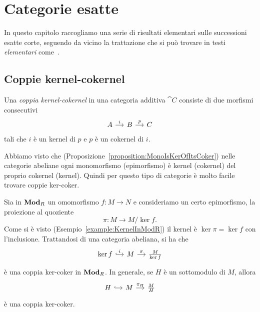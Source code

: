 
\chapter{Categorie esatte}

In questo capitolo raccogliamo una serie di risultati elementari sulle
successioni esatte corte, seguendo da vicino la trattazione che si può
trovare in testi {\em elementari} come~\cite{buehler:exactcategories}.



\section{Coppie kernel-cokernel}

\begin{definition}\label{definition:KerCoker}
  Una {\em coppia kernel-cokernel} in una categoria additiva \(\cat C\)
  consiste di due morfismi consecutivi
  \[
    \begin{tikzcd}[column sep=small]
      A \ar["i", r] & B \ar["p", r] & C
    \end{tikzcd}
  \]
  tali che \(i\) è un kernel di \(p\) e \(p\) è un cokernel di \(i\).
\end{definition}

Abbiamo visto che (Proposizione~\ref{proposition:MonoIsKerOfItsCoker})
nelle categorie abeliane ogni monomorfismo (epimorfismo) è kernel
(cokernel) del proprio cokernel (kernel). Quindi per questo tipo di
categorie è molto facile trovare coppie ker-coker.

\begin{example}
  Sia in \(\mathbf{Mod}_R\) un omomorfismo \(f : M \to N\) e consideriamo un
  certo epimorfismo, la proiezione al quoziente
  \[
    \pi : M \to M/\ker f .
  \]
  Come si è visto (Esempio~\ref{example:KernelInModR}) il kernel è
  \(\ker \pi = \ker f\) con l'inclusione. Trattandosi di una categoria
  abeliana, si ha che
  \[
    \begin{tikzcd}[column sep=small]
      \ker f \ar["i", hookrightarrow, r] & M \ar["\pi", r] &
      \frac{M}{\ker f}
    \end{tikzcd}
  \]
  è una coppia ker-coker in \(\mathbf{Mod}_R\). In generale, se \(H\) è un
  sottomodulo di \(M\), allora
  \[
    \begin{tikzcd}[column sep=small]
      H \ar[hookrightarrow, r] & M \ar["{\pi_H}", r] & \frac{M}{H}
    \end{tikzcd}
  \]
  è una coppia ker-coker.
\end{example}

